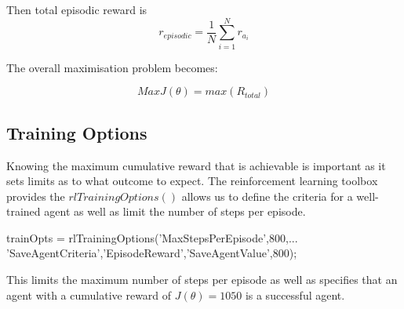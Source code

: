 Then total episodic reward is 
\[r_{episodic} = \frac{1}{N}\sum_{i=1}^{N}r_{a_i}\]

The overall maximisation problem becomes:

\[MaxJ(\theta) = max(R_{total})\]










\subsection{Training Options}

Knowing the maximum cumulative reward that is achievable is important as it sets limits as to what outcome to expect. The reinforcement learning toolbox provides the \(rlTrainingOptions()\) allows us to define the criteria for a well-trained agent as well as limit the number of steps per episode.\\


\begin{center}
    \textsf{trainOpts = rlTrainingOptions('MaxStepsPerEpisode',800,...\\'SaveAgentCriteria','EpisodeReward','SaveAgentValue',800);}\\
\end{center}


\noindent
This limits the maximum number of steps per episode as well as specifies that an agent with a cumulative reward of \(J(\theta) = 1050\)  is a successful agent.